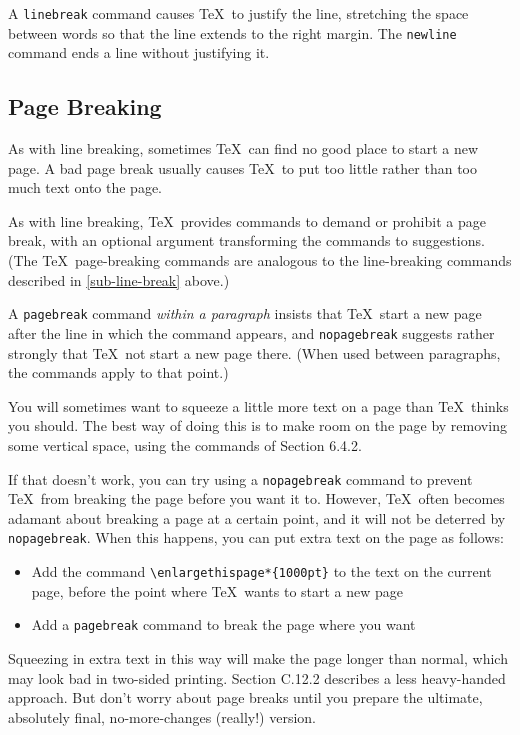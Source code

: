 \documentclass{article}
\begin{document}
A \verb:linebreak: command causes \TeX\ to justify the line, stretching the space between words so
that the line extends to the right margin. The \verb:newline: command ends a line without
justifying it.

\subsection{Page Breaking}

As with line breaking, sometimes \TeX\ can find no good place to start a new page. A bad page break
usually causes \TeX\ to put too little rather than too much text onto the page.

As with line breaking, \TeX\ provides commands to demand or prohibit a page break, with an optional
argument transforming the commands to suggestions. (The \TeX\ page-breaking commands are analogous
to the line-breaking commands described in \ref{sub-line-break} above.)

A \verb:pagebreak: command \emph{within a paragraph} insists that \TeX\ start a new page after
the line in which the command appears, and \verb:nopagebreak: suggests rather strongly
that \TeX\ not start a new page there. (When used between paragraphs, the commands apply to that
point.)

You will sometimes want to squeeze a little more text on a page than \TeX\ thinks you should. The
best way of doing this is to make room on the page by removing some vertical space, using the
commands of Section 6.4.2.

If that doesn't work, you can try using a \verb:nopagebreak: command to prevent \TeX\ from
breaking the page before you want it to. However, \TeX\ often becomes adamant about breaking a page
at a certain point, and it will not be deterred by \verb:nopagebreak:. When this happens, you
can put extra text on the page as follows:

\begin{itemize}
   \item Add the command \verb:\enlargethispage*{1000pt}: to the text on the current page, before
    the point where \TeX\ wants to start a new page
   
   \item Add a \verb:pagebreak: command to break the page where you want
\end{itemize}

Squeezing in extra text in this way will make the page longer than normal, which may look bad in
two-sided printing. Section C.12.2 describes a less heavy-handed approach. But don't worry about
page breaks until you prepare the ultimate, absolutely final, no-more-changes (really!) version.
\end{document}
